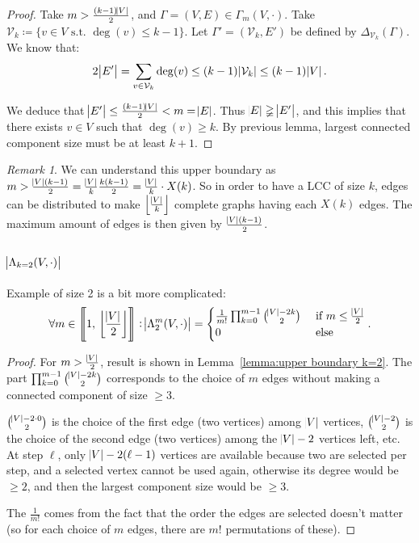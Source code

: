 \documentclass{article}
\theoremstyle{definition}
\theoremstyle{remark}
\newtheorem*{remark}{Remark}
\newcommand{\intint}[2]{\left\llbracket#1, \, #2\right\rrbracket}
\newcommand{\floor}[1]{\left\lfloor#1\right\rfloor}
\newcommand{\st}{\text{ s.t. }}
\begin{document}
		\begin{proof} Take $m > \frac {(k-1)\abs V}2$, and $\Gamma = (V, E) \in \Gamma_m(V, \cdot)$. Take $\mathcal V_k \coloneqq \{v \in V \st \deg(v) \leq k-1\}$.
		Let $\Gamma' = (\mathcal V_k, E')$ be defined by $\Delta_{\mathcal V_k}(\Gamma)$. We know that:
		\[2\abs {E'} = \sum_{v \in \mathcal V_k}\deg(v) \leq (k-1)\abs {\mathcal V_k} \leq (k-1)\abs V.\]

		We deduce that $\abs {E'} \leq \frac {(k-1)\abs V}2 < m = \abs E$. Thus $\abs E \gneqq \abs {E'}$, and this implies that there exists $v \in V$ such that $\deg(v) \geq k$.
		By previous lemma, largest connected component size must be at least $k+1$.
		\end{proof}

		\begin{remark} We can understand this upper boundary as $m > \frac {\abs V(k-1)}2 = \frac {\abs V}k\frac {k(k-1)}2 = \frac {\abs V}k \cdot X(k)$. So in
		order to have a LCC of size $k$, edges can be distributed to make $\floor {\frac {\abs V}k}$ complete graphs having each $X(k)$ edges.
		The maximum amount of edges is then given by $\frac {\abs V(k-1)}2$.
		\end{remark}

	\subsection{$\abs {\Lambda_{k=2}(V, \cdot)}$}
		Example of size 2 is a bit more complicated:
		\[\forall m \in \intint 1{\floor {\frac {\abs V}2}} : \abs {\Lambda_2^m(V, \cdot)} = \begin{cases}
			\frac 1{m!}\prod_{k=0}^{m-1}\binom {\abs V-2k}2 &\text{ if } m \leq \frac {\abs V}2 \\
			0 &\text{ else}
		\end{cases}.\]

		\begin{proof} For $m > \frac {\abs V}2$, result is shown in Lemma~\ref{lemma:upper boundary k=2}. The part $\prod_{k=0}^{m-1}\binom {\abs V-2k}2$ corresponds
		to the choice of $m$ edges without making a connected component of size $\geq 3$.

		$\binom {\abs V-2 \cdot 0}2$ is the choice of the first edge (two vertices) among $\abs V$ vertices, $\binom {\abs V-2}2$ is the choice of the second edge
		(two vertices) among the $\abs V-2$ vertices left, etc. At step $\ell$, only $\abs V-2(\ell-1)$ vertices are available because two are selected per step, and
		a selected vertex cannot be used again, otherwise its degree would be $\geq 2$, and then the largest component size would be $\geq 3$.

		The $\frac 1{m!}$ comes from the fact that the order the edges are selected doesn't matter (so for each choice of $m$ edges, there are $m!$ permutations
		of these).
		\end{proof}
\end{document}
